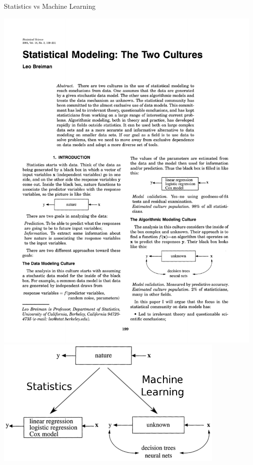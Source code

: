 \documentclass[pdf]{beamer}
\begin{document}
\begin{frame}{Statistics vs Machine Learning}
\begin{center}
	\includegraphics[width=\textwidth]{breimanPaper.pdf}\\
	\includegraphics[width=0.85\textwidth]{statsvsML.png}
\end{center}
\end{frame}
\end{document}
